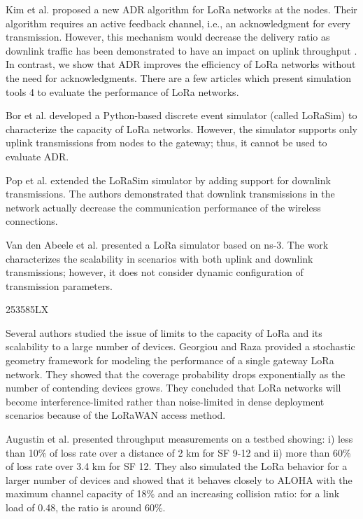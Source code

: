 Kim et al.
\cite{kim_adaptive_2017} proposed a new ADR algorithm for LoRa networks at the nodes.
Their algorithm requires an active feedback channel,
	i.e.,
	an acknowledgment for every transmission.
However,
	this mechanism would decrease the delivery ratio as downlink traffic has been demonstrated to have an impact on uplink throughput \cite{pop_does_2017}.
In contrast,
	we show that ADR improves the efficiency of LoRa networks without the need for acknowledgments.
There are a few articles which present simulation tools 4 to evaluate the performance of LoRa networks.

Bor et al.
\cite{bor_lora_2016} developed a Python-based discrete event simulator (called LoRaSim) to characterize the capacity of LoRa networks.
However,
	the simulator supports only uplink transmissions from nodes to the gateway;
	thus,
	it cannot be used to evaluate ADR.

Pop et al.
\cite{pop_does_2017} extended the LoRaSim simulator by adding support for downlink transmissions.
The authors demonstrated that downlink transmissions in the network actually decrease the communication performance of the wireless connections.

Van den Abeele et al.
\cite{abeele_scalability_2017} presented a LoRa simulator based on ns-3.
The work characterizes the scalability in scenarios with both uplink and downlink transmissions;
	however,
	it does not consider dynamic configuration of transmission parameters.

\cite{to_simulation_2018} 253585LX

Several authors studied the issue of limits to the capacity of LoRa and its scalability to a large number of devices.
Georgiou and Raza \cite{georgiou_low_2017} provided a stochastic geometry framework for modeling the performance of a single gateway LoRa network.
They showed that the coverage probability drops exponentially as the number of contending devices grows.
They concluded that LoRa networks will become interference-limited rather than noise-limited in dense deployment scenarios because of the LoRaWAN access method.

Augustin et al.
\cite{augustin_study_2016} presented throughput measurements on a testbed showing:
	i) less than 10\% of loss rate over a distance
of 2 km for SF 9-12 and ii) more than 60\% of loss rate over
3.4 km for SF 12.
They also simulated the LoRa behavior for a larger number of devices and showed that it behaves closely to ALOHA with the maximum channel capacity of 18\% and
an increasing collision ratio:
	for a link load of 0.48,
	the ratio is around 60\%.

